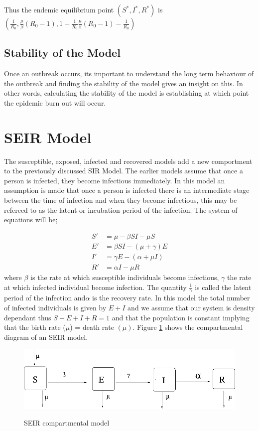  Thus the endemic equilibrium point $( S^*,I^*,R^*)$ is 
 $\left( \frac{1}{R_0}, \frac{\mu}{\beta} (R_0 -1), 1 -  \frac{1}{R_0} \frac{\mu}{\beta} (R_0 -1) - \frac{1}{R_0} \right)$
 
 
  \subsection{Stability of the Model}
 Once an outbreak occurs, its important to understand the long term behaviour of the outbreak and finding the stability of the model gives an insight on this. In other words, calculating the stability of the model is establishing at which point the epidemic burn out will occur.
 \section{SEIR Model}
The susceptible, exposed, infected and recovered models add a new comportment to the previously discussed SIR Model. The earlier models assume that once a person is infected, they become infectious immediately. In this model an assumption is made that once a person is infected there is an intermediate stage between the time of infection and when they become infectious, this may be refereed to as the latent or incubation period of the infection. The system of equations will be;

\begin{align}
S'& = \mu -\beta S I - \mu S \label{5} \\
E' &= \beta S I - (\mu + \gamma) E  \label{6}\\
I' &= \gamma E - (\alpha + \mu I) \label{7}\\
R' &= \alpha I  - \mu R \label{8}
\end{align}
where $\beta$ is the rate at which susceptible individuals become infectious, $\gamma$ the rate at which infected individual become infection. The quantity $\frac{1}{\gamma}$ is called the latent period of the  infection and$\alpha$ is the recovery rate.
In this model the total number of infected individuals is given by $E +I$ and  we assume that our system is density dependant thus $S + E + I + R = 1$ and  that the population is constant implying that the birth rate ($\mu$)  = death rate $(\mu)$. Figure \ref{fig 4.2} shows the compartmental diagram of an SEIR model.
\begin{figure}[h!]
 \caption{SEIR compartmental model}
 \centering
 \includegraphics[scale=0.5]{images/seir.png}\label{fig 4.2}
 \end{figure}
  
